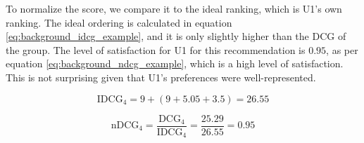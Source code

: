 To normalize the score, we compare it to the ideal ranking, which is U1's own ranking. The ideal ordering is calculated in equation \ref{eq:background_idcg_example}, and it is only slightly higher than the DCG of the group. The level of satisfaction for U1 for this recommendation is $0.95$, as per equation \ref{eq:background_ndcg_example}, which is a high level of satisfaction. This is not surprising given that U1's preferences were well-represented.

\begin{equation}\label{eq:background_idcg_example}
\text{IDCG}_4 = 9 + (9 + 5.05 + 3.5) = 26.55
\end{equation}

\begin{equation}\label{eq:background_ndcg_example}
\text{nDCG}_4 = \frac{\text{DCG}_4}{\text{IDCG}_4} = \frac{25.29}{26.55}=0.95
\end{equation}